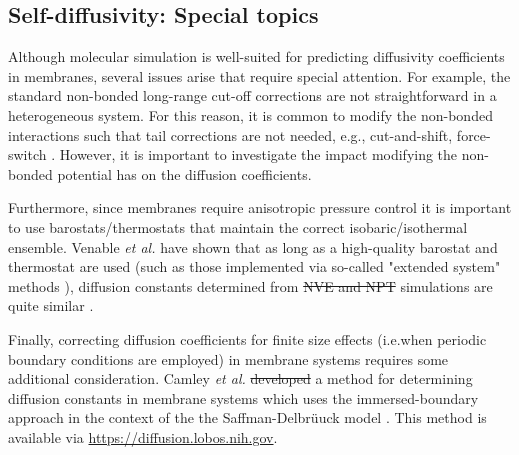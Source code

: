 \documentclass[9pt,bestpractices]{livecoms}
\providecommand{\DIFadd}[1]{{\protect\color{blue}\uwave{#1}}} %
\providecommand{\DIFdel}[1]{{\protect\color{red}\sout{#1}}}                      %
\providecommand{\DIFaddbegin}{} %
\providecommand{\DIFaddend}{} %
\providecommand{\DIFdelbegin}{} %
\providecommand{\DIFdelend}{} %
\begin{document}
\subsection{Self-diffusivity: Special topics} \label{sec:Self-Diffusivity Special topics}

Although molecular simulation is well-suited for predicting diffusivity coefficients in membranes, several issues arise that require special attention. For example, the standard non-bonded long-range cut-off corrections are not straightforward in a heterogeneous system. For this reason, it is common to modify the non-bonded interactions such that tail corrections are not needed, e.g., cut-and-shift, force-switch \cite{GROMACS,Brooks2009}. However, it is important to investigate the impact modifying the non-bonded potential has on the diffusion coefficients. 
\DIFaddbegin 

\DIFaddend Furthermore, since membranes require anisotropic pressure control it is important to use barostats/thermostats that maintain the correct isobaric/isothermal ensemble. Venable \textit{et al.} have shown that as long as a high-quality barostat and thermostat are used (such as those implemented via so-called "extended system" methods \cite{Nose1984,Hoover1985}), diffusion constants determined from \DIFdelbegin \DIFdel{NVE and NPT }\DIFdelend \DIFaddbegin \DIFadd{$NVE$ and $NPT$ }\DIFaddend simulations are quite similar \cite{Venable2017}. 
\DIFaddbegin 

\DIFaddend Finally, correcting diffusion coefficients for finite size effects (i.e.\DIFaddbegin \DIFadd{, }\DIFaddend when periodic boundary conditions are employed) in membrane systems requires some additional consideration. Camley \textit{et al.} \DIFdelbegin \DIFdel{developed }\DIFdelend \DIFaddbegin \DIFadd{develop }\DIFaddend a method for determining diffusion constants in membrane systems which uses the immersed-boundary approach in the context of the the Saffman-Delbr{\"u}uck model \cite{Camley2015}. This method is available via \url{https://diffusion.lobos.nih.gov}.


\end{document}
